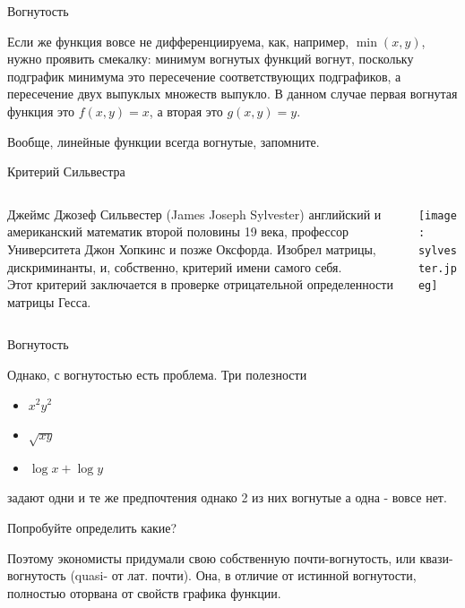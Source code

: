 \documentclass{beamer}
\begin{document}
\begin{frame}{Вогнутость}

Если же функция вовсе не дифференциируема, как, например, $\min(x,y)$, нужно проявить смекалку: \alert {минимум вогнутых функций вогнут}, поскольку подграфик минимума это пересечение соответствующих подграфиков, а \alert{пересечение двух выпуклых множеств выпукло}. В данном случае первая вогнутая функция это $f(x,y) = x$, а вторая это $g(x,y) = y$. 

Вообще, \alert{линейные функции всегда вогнутые}, запомните.

\end{frame}

\begin{frame}{Критерий Сильвестра}

\begin{columns}
\begin{column}{0.5\textwidth}
   \alert{Джеймс Джозеф Сильвестер} (James Joseph Sylvester) английский и американский математик второй половины 19 века, профессор Университета Джон Хопкинс и позже Оксфорда. Изобрел матрицы, дискриминанты, и, собственно, критерий имени самого себя. \\ Этот критерий заключается в проверке отрицательной определенности матрицы Гесса.
\end{column}
\begin{column}{0.5\textwidth}  %
    \begin{center}
     \texttt{[image: sylvester.jpeg]}
     \end{center}
\end{column}
\end{columns}

\end{frame}

\begin{frame}{Вогнутость}

Однако, с вогнутостью есть проблема. Три полезности

\begin{itemize}
  \item $x^2y^2$
  \item $\sqrt{xy}$
  \item $\log x + \log y$
\end{itemize}

задают одни и те же предпочтения однако 2 из них вогнутые а одна - вовсе нет.

Попробуйте определить какие?

Поэтому экономисты придумали свою собственную почти-вогнутость, или \alert{квази-вогнутость} (quasi- от лат. почти). Она, в отличие от истинной вогнутости, полностью оторвана от свойств графика функции.

\end{frame}
\end{document}
